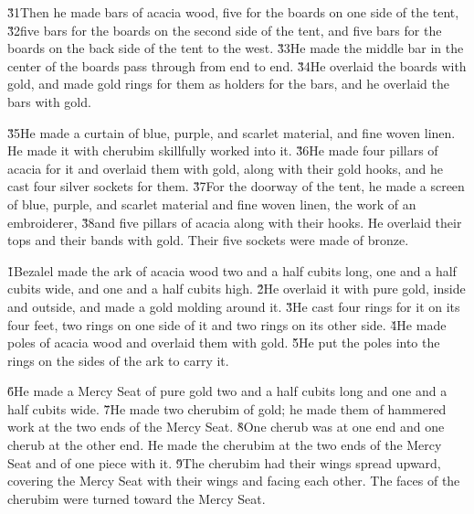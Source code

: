 \v{31}Then he made bars of acacia wood, five for the boards on one side of the tent, \v{32}five bars for the boards on the second side of the tent, and five bars for the boards on the back side of the tent to the west. \v{33}He made the middle bar in the center of the boards pass through from end to end. \v{34}He overlaid the boards with gold, and made gold rings for them as holders for the bars, and he overlaid the bars with gold.

\v{35}He made a curtain of blue, purple, and scarlet material, and fine woven linen. He made it with cherubim skillfully worked into it. \v{36}He made four pillars of acacia for it and overlaid them with gold, along with their gold hooks, and he cast four silver sockets for them. \v{37}For the doorway of the tent, he made a screen of blue, purple, and scarlet material and fine woven linen, the work of an embroiderer, \v{38}and five pillars of acacia along with their hooks. He overlaid their tops and their bands with gold. Their five sockets were made of bronze.

\v{1}Bezalel made the ark of acacia wood two and a half cubits long, one and a half cubits wide, and one and a half cubits high. \v{2}He overlaid it with pure gold, inside and outside, and made a gold molding around it. \v{3}He cast four rings for it on its four feet, two rings on one side of it and two rings on its other side. \v{4}He made poles of acacia wood and overlaid them with gold. \v{5}He put the poles into the rings on the sides of the ark to carry it.

\v{6}He made a Mercy Seat of pure gold two and a half cubits long and one and a half cubits wide. \v{7}He made two cherubim of gold; he made them of hammered work at the two ends of the Mercy Seat. \v{8}One cherub was at one end and one cherub at the other end. He made the cherubim at the two ends of the Mercy Seat and of one piece with it. \v{9}The cherubim had their wings spread upward, covering the Mercy Seat with their wings and facing each other. The faces of the cherubim were turned toward the Mercy Seat.

